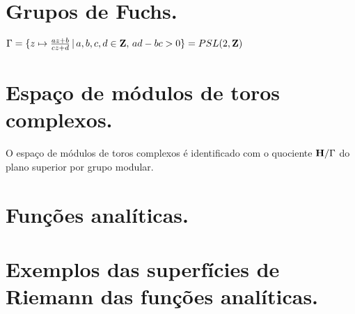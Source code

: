 \section{Grupos de Fuchs.}

\begin{exem}
$\Gamma = \{ z \mapsto \frac{az+b}{cz+d} \,|\, a,b,c,d\in\mathbf{Z}, \, ad-bc>0 \} = PSL(2,\mathbf{Z})$
\end{exem}

\section{Espaço de módulos de toros complexos.}

\begin{teorema}
O espaço de módulos de toros complexos é identificado com o quociente $\mathbf{H}/\Gamma$
do plano superior por grupo modular.
\end{teorema}

\section{Funções analíticas.}

\section{Exemplos das superfícies de Riemann das funções analíticas.}
